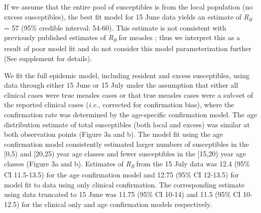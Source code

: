If we assume that the entire pool of susceptibles is from the local population (no excess susceptibles), the best fit model for 15 June data yields an estimate of \emph{R\textsubscript{0}} = 57 (95\% credible interval: 54-60). This estimate is not consistent with previously published estimates of \emph{R\textsubscript{0}} for measles \cite{EDMUNDS_2000,MOSSONG_2000}; thus we interpret this as a result of poor model fit and do not consider this model parameterization further (See supplement for details).

We fit the full epidemic model, including resident and excess susceptibles, using data through either 15 June or 15 July under the assumption that either all clinical cases were true measles cases or that true measles cases were a sub-set of the reported clinical cases (\emph{i.e.}, corrected for confirmation bias), where the confirmation rate was determined by the age-specific confirmation model. The age distribution estimate of total susceptibles (both local and excess) was similar at both observation points (Figure 3a and b). The model fit using the age confirmation model consistently estimated larger numbers of susceptibles in the {[}0,5) and {[}20,25{)} year age classes and fewer susceptibles in the {[}15,20) year age classes (Figure 3a and b). Estimates of \emph{R\textsubscript{0}} from the 15 July data was 12.4 (95\% CI 11.5-13.5) for the age confirmation model and 12.75 (95\% CI 12-13.5) for model fit to data using only clinical confirmation. The corresponding estimate using data truncated to 15 June was 11.75 (95\% CI 10-14) and 11.5 (95\% CI 10-12.5) for the clinical only and age confirmation models respectively.
